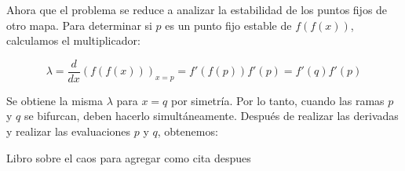         Ahora que el problema se reduce a analizar la estabilidad de los puntos fijos de otro mapa. Para determinar si $p$ es un punto fijo estable de $f(f(x))$, calculamos el multiplicador:

        \begin{equation}
            \lambda = \frac{d}{dx} ( f( f(x) ) )_{x=p} = f'(f(p))f'(p) = f'(q)f'(p)
        \end{equation}

        Se obtiene la misma $\lambda$ para $x = q$ por simetría. Por lo tanto, cuando las ramas $p$ y $q$ se bifurcan, deben hacerlo simultáneamente. Después de realizar las derivadas y realizar las evaluaciones $p$ y $q$, obtenemos:

        





Libro sobre el caos para agregar como cita despues \cite{Gleick1987}
 
